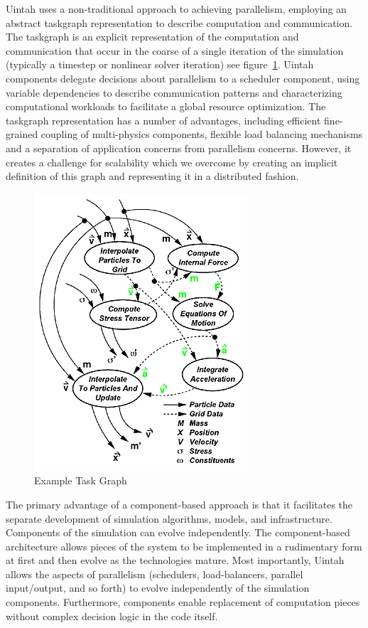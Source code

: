 \documentclass[12pt]{report}
\begin{document}
Uintah uses a non-traditional approach to achieving parallelism,
employing an abstract taskgraph representation to describe computation
and communication. The taskgraph is an explicit representation of the
computation and communication that occur in the coarse of a single
iteration of the simulation (typically a timestep or nonlinear solver
iteration) see figure~\ref{fig:TaskGraph}. Uintah components delegate
decisions about parallelism to a scheduler component, using variable
dependencies to describe communication patterns and characterizing
computational workloads to facilitate a global resource
optimization. The taskgraph representation has a number of advantages,
including efficient fine-grained coupling of multi-physics components,
flexible load balancing mechanisms and a separation of application
concerns from parallelism concerns. However, it creates a challenge
for scalability which we overcome by creating an implicit definition
of this graph and representing it in a distributed fashion.
\begin{figure}
  \includegraphics[scale=1]{Taskgraph-diagram.png}
  \caption{Example Task Graph}
  \label{fig:TaskGraph}
\end{figure}


The primary advantage of a component-based approach is that it
facilitates the separate development of simulation algorithms, models,
and infrastructure. Components of the simulation can evolve
independently. The component-based architecture allows pieces of the
system to be implemented in a rudimentary form at first and then
evolve as the technologies mature. Most importantly, Uintah allows the
aspects of parallelism (schedulers, load-balancers, parallel
input/output, and so forth) to evolve independently of the simulation
components. Furthermore, components enable replacement of computation
pieces without complex decision logic in the code itself.
\end{document}

